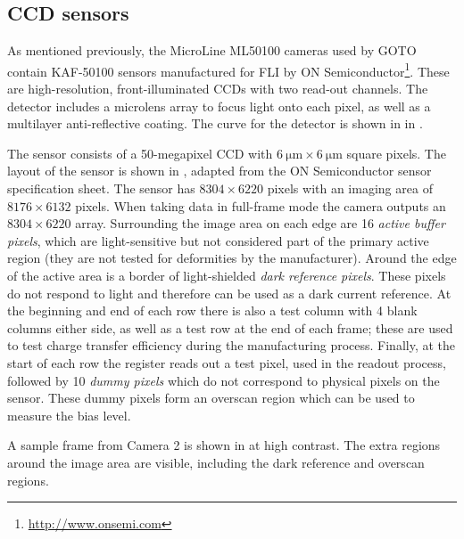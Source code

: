 \subsection{CCD sensors}
\label{sec:chip_layout}
\begin{colsection}

As mentioned previously, the MicroLine ML50100 cameras used by GOTO contain KAF-50100  sensors manufactured for FLI by ON Semiconductor\footnote{\url{http://www.onsemi.com}}. These are high-resolution, front-illuminated CCDs with two read-out channels. The detector includes a microlens array to focus light onto each pixel, as well as a multilayer anti-reflective coating. The  curve for the detector is shown in  in .

The sensor consists of a 50-megapixel CCD with $\SI{6}{\micro\metre} \times \SI{6}{\micro\metre}$ square pixels. The layout of the sensor is shown in , adapted from the ON Semiconductor sensor specification sheet. The sensor has $8304 \times 6220$ pixels with an imaging area of $8176 \times 6132$ pixels. When taking data in full-frame mode the camera outputs an $8304 \times 6220$ array. Surrounding the image area on each edge are 16 \emph{active buffer pixels}, which are light-sensitive but not considered part of the primary active region (they are not tested for deformities by the manufacturer). Around the edge of the active area is a border of light-shielded \emph{dark reference pixels}. These pixels do not respond to light and therefore can be used as a dark current reference. At the beginning and end of each row there is also a test column with 4 blank columns either side, as well as a test row at the end of each frame; these are used to test charge transfer efficiency during the manufacturing process. Finally, at the start of each row the register reads out a test pixel, used in the readout process, followed by 10 \emph{dummy pixels} which do not correspond to physical pixels on the sensor. These dummy pixels form an overscan region which can be used to measure the bias level.

A sample frame from Camera 2 is shown in  at high contrast. The extra regions around the image area are visible, including the dark reference and overscan regions.


\end{colsection}
